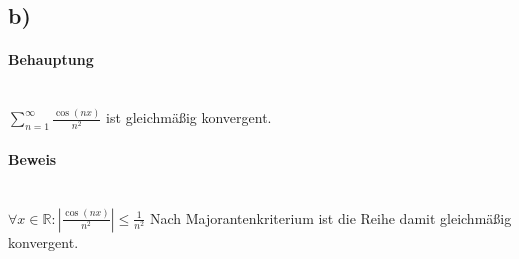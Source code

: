 \subsection*{b)}

\paragraph*{Behauptung} ~\\
$ \sum\limits_{n=1}^\infty \frac{\cos(nx)}{n^{2}} $ ist gleichmäßig konvergent.

\paragraph*{Beweis} ~\\
$ \forall x \in \mathbb{R} : |\frac{\cos(nx)}{n^{2}}| \leq \frac{1}{n^{2}} $
Nach Majorantenkriterium ist die Reihe damit gleichmäßig konvergent.


